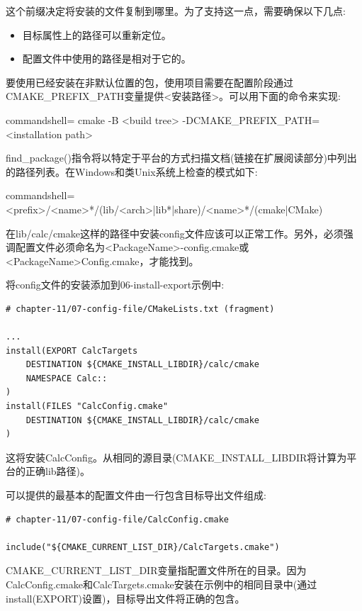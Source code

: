 这个前缀决定将安装的文件复制到哪里。为了支持这一点，需要确保以下几点:

\begin{itemize}
\item 
目标属性上的路径可以重新定位。

\item 
配置文件中使用的路径是相对于它的。
\end{itemize}

要使用已经安装在非默认位置的包，使用项目需要在配置阶段通过CMAKE\_PREFIX\_PATH变量提供<安装路径>。可以用下面的命令来实现:

\begin{tcblisting}{commandshell={}}
cmake -B <build tree> -DCMAKE_PREFIX_PATH=<installation path>
\end{tcblisting}

find\_package()指令将以特定于平台的方式扫描文档(链接在扩展阅读部分)中列出的路径列表。在Windows和类Unix系统上检查的模式如下:

\begin{tcblisting}{commandshell={}}
<prefix>/<name>*/(lib/<arch>|lib*|share)/<name>*/(cmake|CMake)
\end{tcblisting}

在lib/calc/cmake这样的路径中安装config文件应该可以正常工作。另外，必须强调配置文件必须命名为<PackageName>-config.cmake或<PackageName>Config.cmake，才能找到。

将config文件的安装添加到06-install-export示例中:

\begin{lstlisting}[style=styleCMake]
# chapter-11/07-config-file/CMakeLists.txt (fragment)

...
install(EXPORT CalcTargets
	DESTINATION ${CMAKE_INSTALL_LIBDIR}/calc/cmake
	NAMESPACE Calc::
)
install(FILES "CalcConfig.cmake"
	DESTINATION ${CMAKE_INSTALL_LIBDIR}/calc/cmake
)
\end{lstlisting}

这将安装CalcConfig。从相同的源目录(CMAKE\_INSTALL\_LIBDIR将计算为平台的正确lib路径)。

可以提供的最基本的配置文件由一行包含目标导出文件组成:

\begin{lstlisting}[style=styleCMake]
# chapter-11/07-config-file/CalcConfig.cmake

include("${CMAKE_CURRENT_LIST_DIR}/CalcTargets.cmake")
\end{lstlisting}

CMAKE\_CURRENT\_LIST\_DIR变量指配置文件所在的目录。因为CalcConfig.cmake和CalcTargets.cmake安装在示例中的相同目录中(通过install(EXPORT)设置)，目标导出文件将正确的包含。

